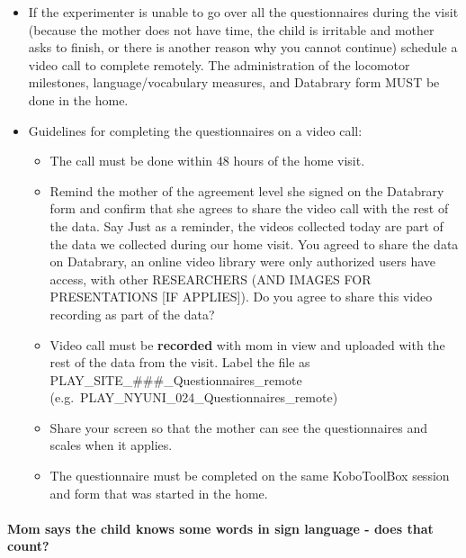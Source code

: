 \documentclass[
  12pt,
]{book}
\providecommand{\tightlist}{%
  \setlength{\itemsep}{0pt}\setlength{\parskip}{0pt}}
\begin{document}
\begin{itemize}
\tightlist
\item
  If the experimenter is unable to go over all the questionnaires during the visit (because the mother does not have time, the child is irritable and mother asks to finish, or there is another reason why you cannot continue) schedule a video call to complete remotely. The administration of the locomotor milestones, language/vocabulary measures, and Databrary form MUST be done in the home.
\item
  Guidelines for completing the questionnaires on a video call:

  \begin{itemize}
  \tightlist
  \item
    The call must be done within 48 hours of the home visit.
  \item
    Remind the mother of the agreement level she signed on the Databrary form and confirm that she agrees to share the video call with the rest of the data. Say Just as a reminder, the videos collected today are part of the data we collected during our home visit. You agreed to share the data on Databrary, an online video library were only authorized users have access, with other RESEARCHERS (AND IMAGES FOR PRESENTATIONS {[}IF APPLIES{]}). Do you agree to share this video recording as part of the data?
  \item
    Video call must be \textbf{recorded} with mom in view and uploaded with the rest of the data from the visit. Label the file as PLAY\_SITE\_\#\#\#\_Questionnaires\_remote (e.g.~PLAY\_NYUNI\_024\_Questionnaires\_remote)
  \item
    Share your screen so that the mother can see the questionnaires and scales when it applies.
  \item
    The questionnaire must be completed on the same KoboToolBox session and form that was started in the home.
  \end{itemize}
\end{itemize}

\hypertarget{mom-says-the-child-knows-some-words-in-sign-language---does-that-count}{%
\paragraph*{Mom says the child knows some words in sign language - does that count?}\label{mom-says-the-child-knows-some-words-in-sign-language---does-that-count}}
\end{document}
